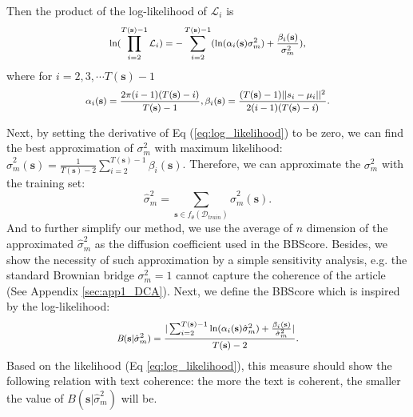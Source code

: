 \documentclass[letterpaper]{article} %
\def \bb{\textit{B}}
\def \ss{\mathbf{s}}
\begin{document}
Then the product of the log-likelihood of $\mathcal{L}_i$ is
\begin{equation}
\footnotesize 
\begin{aligned}
\label{eq:log_likelihood}
\ln (\prod_{i=2}^{T(\ss)-1} \mathcal{L}_i) = -\sum_{i=2}^{T(\ss)-1} (\ln(\alpha_i(\ss) \sigma_m^2) + \frac{\beta_i(\ss)}{\sigma_m^2}),
\end{aligned}
\end{equation}
where for $i=2,3,\cdots T(\ss)-1$
\begin{equation*}
\footnotesize
\begin{aligned}
\alpha_i(\ss) = \frac{2\pi (i-1)(T(\ss)-i)}{T(\ss)-1}, \beta_i(\ss) = \frac{(T(\ss)-1)||s_i -\mu_i||^2}{ 2(i-1) (T(\ss)-i)}.
\end{aligned}
\end{equation*}

Next, by setting the derivative of Eq (\ref{eq:log_likelihood}) to be zero, we can find the best approximation of $\sigma_m^2$ with maximum likelihood: $\hat{\sigma}_m^2(\ss) = \frac{1}{T(\ss)-2} \sum_{i=2}^{T(\ss)-1} \beta_i(\ss)$. Therefore, we can approximate the $\sigma_m^2$ with the training set: \[\hat{\sigma}_m^2 = \sum_{\ss \in f_\theta(\mathcal{D}_{train})} \hat{\sigma}_m^2(\ss).\]
And to further simplify our method, we use the average of $n$ dimension of the approximated $\hat{\sigma}_m^2$ as the diffusion coefficient used in the BBScore. Besides, we show the necessity of such approximation by a simple sensitivity analysis, e.g. the standard Brownian bridge $\sigma_m^2=1$ cannot capture the coherence of the article (See Appendix \ref{sec:app1_DCA}). Next, we define the BBScore which is inspired by the log-likelihood:
\begin{equation}
\label{eq:evaluation_measure}
\footnotesize
\begin{aligned}
\bb (\ss| \hat{\sigma}_m^2) = \frac{|\sum_{i=2}^{T(\ss)-1} \ln(\alpha_i(\ss) \hat{\sigma}_m^2)+ \frac{\beta_i(\ss)}{\hat{\sigma}_m^2}|}{T(\ss)-2}.
\end{aligned}
\end{equation}
Based on the likelihood (Eq \eqref{eq:log_likelihood}), this measure should show the following relation with text coherence: the more the text is coherent, the smaller the value of $\bb (\ss| \hat{\sigma}_m^2)$ will be. 
\end{document}
